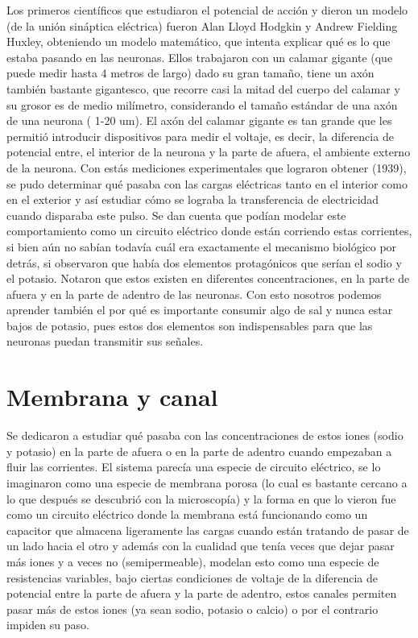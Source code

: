 Los primeros científicos que estudiaron el potencial de acción y dieron un modelo (de la unión sináptica eléctrica)  fueron Alan Lloyd Hodgkin y Andrew Fielding Huxley, 
obteniendo un modelo matemático, que intenta explicar qué es lo que estaba pasando en las neuronas. Ellos trabajaron con un calamar gigante (que puede medir hasta 4 metros de largo) dado su gran tamaño, tiene un axón también bastante gigantesco, que recorre casi la mitad del cuerpo del calamar y su grosor es de medio milímetro, considerando el tamaño estándar de una axón de una neurona ( 1-20 um). El axón del calamar gigante es tan grande que les permitió introducir dispositivos para medir el voltaje, es decir, la diferencia de potencial entre, el interior de la neurona y la parte de afuera, el ambiente externo de la neurona. Con estás mediciones experimentales que lograron obtener (1939), se pudo determinar qué pasaba con las cargas eléctricas tanto en el interior como en el exterior y así estudiar cómo se lograba la transferencia de electricidad cuando disparaba este pulso. 
 Se dan cuenta que podían modelar este comportamiento como un circuito eléctrico donde están corriendo estas corrientes, si bien aún no sabían todavía cuál era exactamente el mecanismo biológico por detrás, si observaron que había dos elementos protagónicos que serían el sodio y el potasio.
 Notaron que estos existen en diferentes concentraciones, en la parte de afuera y en la parte de adentro de las neuronas. Con esto nosotros podemos aprender también el por qué es importante consumir algo de sal y nunca estar bajos de potasio, pues estos dos elementos son indispensables para que las neuronas puedan transmitir sus señales. 

\section{Membrana y canal}

Se dedicaron a estudiar qué pasaba con las concentraciones de estos iones (sodio y potasio) en la parte de afuera o en la parte de adentro cuando empezaban a fluir las corrientes. El sistema parecía una especie de circuito eléctrico, se lo imaginaron como una especie de membrana porosa (lo cual es bastante cercano a lo que después se descubrió  con la microscopía) y la forma en que lo vieron fue como un circuito eléctrico donde la membrana está funcionando como un capacitor que almacena ligeramente las cargas cuando están tratando de pasar de un lado hacia el otro y además con la cualidad que tenía veces que dejar pasar más iones y a veces no (semipermeable), modelan esto como una especie de resistencias variables, bajo ciertas condiciones de voltaje de la diferencia de potencial entre la parte de afuera y la parte de adentro, estos canales permiten pasar más de estos iones (ya sean sodio, potasio o calcio) o por el contrario impiden su paso.

